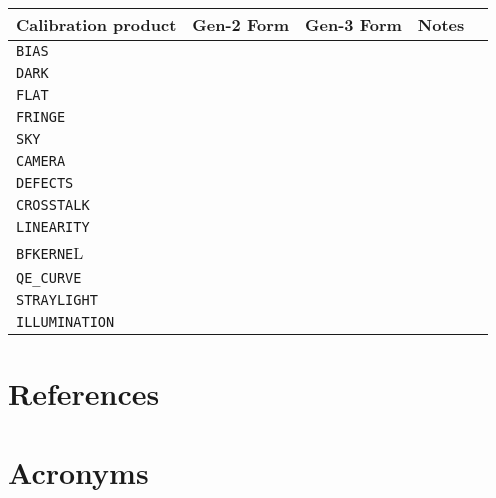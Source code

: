 \documentclass[DM,authoryear,toc]{lsstdoc}
\begin{document}
\begin{tabular}{l |c|c|l|l}
  Calibration product & Gen-2 Form & Gen-3 Form & Notes \\
  \hline
  \verb|BIAS| & & & \\
  \verb|DARK| & & & \\
  \verb|FLAT| & & & \\
  \verb|FRINGE| & & & \\
  \verb|SKY| & & & \\
  \verb|CAMERA| & & & \\
  \verb|DEFECTS| & & & \\
  \verb|CROSSTALK| & & & \\
  \verb|LINEARITY| & & & \\
  \verb|BFKERNE|L & & & \\
  \verb|QE_CURVE| & & & \\
  \verb|STRAYLIGHT| & & & \\
  \verb|ILLUMINATION| & & & \\
\end{tabular}

\section{References} \label{sec:bib}


\section{Acronyms} \label{sec:acronyms}

\end{document}

